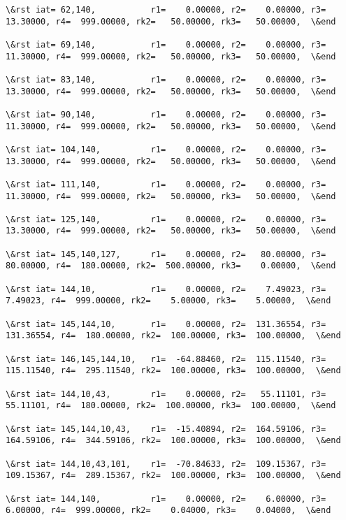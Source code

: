 \documentclass[11pt]{article}
\begin{document}
\begin{Verbatim}[commandchars=\\\{\}]
\&rst iat= 62,140,           r1=    0.00000, r2=    0.00000, r3=   13.30000, r4=  999.00000, rk2=   50.00000, rk3=   50.00000,  \&end

\&rst iat= 69,140,           r1=    0.00000, r2=    0.00000, r3=   11.30000, r4=  999.00000, rk2=   50.00000, rk3=   50.00000,  \&end

\&rst iat= 83,140,           r1=    0.00000, r2=    0.00000, r3=   13.30000, r4=  999.00000, rk2=   50.00000, rk3=   50.00000,  \&end

\&rst iat= 90,140,           r1=    0.00000, r2=    0.00000, r3=   11.30000, r4=  999.00000, rk2=   50.00000, rk3=   50.00000,  \&end

\&rst iat= 104,140,          r1=    0.00000, r2=    0.00000, r3=   13.30000, r4=  999.00000, rk2=   50.00000, rk3=   50.00000,  \&end

\&rst iat= 111,140,          r1=    0.00000, r2=    0.00000, r3=   11.30000, r4=  999.00000, rk2=   50.00000, rk3=   50.00000,  \&end

\&rst iat= 125,140,          r1=    0.00000, r2=    0.00000, r3=   13.30000, r4=  999.00000, rk2=   50.00000, rk3=   50.00000,  \&end

\&rst iat= 145,140,127,      r1=    0.00000, r2=   80.00000, r3=   80.00000, r4=  180.00000, rk2=  500.00000, rk3=    0.00000,  \&end

\&rst iat= 144,10,           r1=    0.00000, r2=    7.49023, r3=    7.49023, r4=  999.00000, rk2=    5.00000, rk3=    5.00000,  \&end

\&rst iat= 145,144,10,       r1=    0.00000, r2=  131.36554, r3=  131.36554, r4=  180.00000, rk2=  100.00000, rk3=  100.00000,  \&end

\&rst iat= 146,145,144,10,   r1=  -64.88460, r2=  115.11540, r3=  115.11540, r4=  295.11540, rk2=  100.00000, rk3=  100.00000,  \&end

\&rst iat= 144,10,43,        r1=    0.00000, r2=   55.11101, r3=   55.11101, r4=  180.00000, rk2=  100.00000, rk3=  100.00000,  \&end

\&rst iat= 145,144,10,43,    r1=  -15.40894, r2=  164.59106, r3=  164.59106, r4=  344.59106, rk2=  100.00000, rk3=  100.00000,  \&end

\&rst iat= 144,10,43,101,    r1=  -70.84633, r2=  109.15367, r3=  109.15367, r4=  289.15367, rk2=  100.00000, rk3=  100.00000,  \&end

\&rst iat= 144,140,          r1=    0.00000, r2=    6.00000, r3=    6.00000, r4=  999.00000, rk2=    0.04000, rk3=    0.04000,  \&end


\end{Verbatim}
\end{document}
